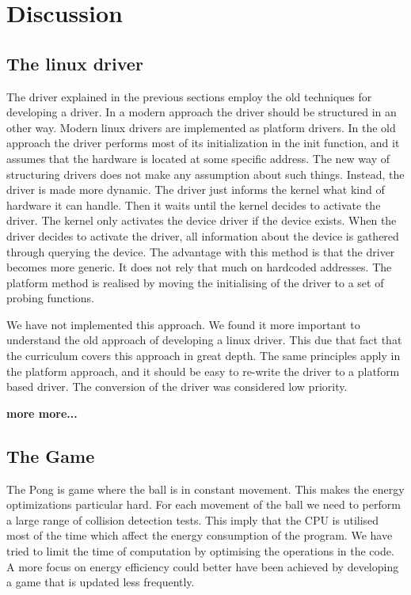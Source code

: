 \section{Discussion}


\subsection{The linux driver}
The driver explained in the previous sections employ the old techniques for developing a driver. In a modern approach the driver should be structured in an other way. Modern linux drivers are implemented as platform drivers. In the old approach the driver performs most of its initialization in the init function, and it assumes that the hardware is located at some specific address. The new way of structuring drivers does not make any assumption about such things. Instead, the driver is made more dynamic. The driver just informs the kernel what kind of hardware it can handle. Then it waits until the kernel decides to activate the driver. The kernel only activates the device driver if the device exists. When the driver decides to activate the driver, all information about the device is gathered through querying the device. The advantage with this method is that the driver becomes more generic. It does not rely that much on hardcoded addresses. The platform method is realised by moving the initialising  of the driver to a set of probing functions. 

We have not implemented this approach. We found it more important to understand the old approach of developing a linux driver. This due that fact that the curriculum covers this approach in great depth. The same principles apply in the platform approach, and it should be easy to re-write the driver to a platform based driver. The conversion of the driver was considered low priority. 

{\bf more more...}



\subsection{The Game}
The Pong is game where the ball is in constant movement. This makes the energy optimizations particular hard. For each movement of the ball we need to perform a large range of collision detection tests. This imply that the CPU is utilised most of the time which affect the energy consumption of the program. We have tried to limit the time of computation by optimising the operations in the code. A more focus on energy efficiency could better have been achieved by developing a game that is updated less frequently. 










